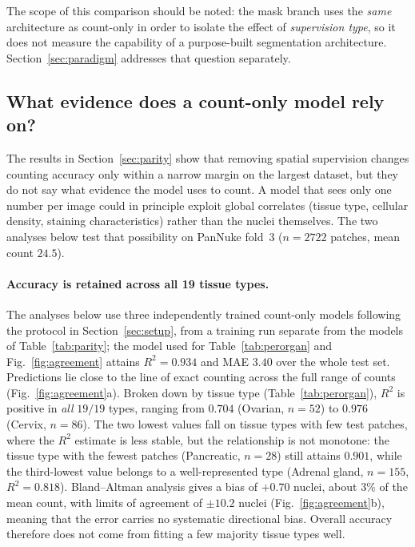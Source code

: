 \documentclass[pdflatex,sn-mathphys-num]{sn-jnl}
\begin{document}
The scope of this comparison should be noted: the mask branch uses the \emph{same} architecture as count-only
in order to isolate the effect of \emph{supervision type}, so it does not measure the capability of a
purpose-built segmentation architecture. Section~\ref{sec:paradigm} addresses that question separately.

\subsection{What evidence does a count-only model rely on?}\label{sec:fidelity}

The results in Section~\ref{sec:parity} show that removing spatial supervision changes counting accuracy only
within a narrow margin on the largest dataset, but they do not say what evidence the model uses to count. A
model that sees only one number per image could in principle exploit global correlates (tissue type, cellular
density, staining characteristics) rather than the nuclei themselves. The two analyses below test that
possibility on PanNuke fold~3 ($n=2722$ patches, mean count $24.5$).

\paragraph{Accuracy is retained across all 19 tissue types.} The analyses below use three independently trained
count-only models following the protocol in Section~\ref{sec:setup}, from a training run separate from the
models of Table~\ref{tab:parity}; the model used for Table~\ref{tab:perorgan} and Fig.~\ref{fig:agreement}
attains $R^2 = 0.934$ and MAE $3.40$ over the whole test set. Predictions lie close to the line of exact
counting across the full range of counts (Fig.~\ref{fig:agreement}a). Broken down by tissue type
(Table~\ref{tab:perorgan}), $R^2$ is positive in \emph{all} $19/19$ types, ranging from $0.704$ (Ovarian,
$n=52$) to $0.976$ (Cervix, $n=86$). The two lowest values fall on tissue types with few test patches, where
the $R^2$ estimate is less stable, but the relationship is not monotone: the tissue type with the fewest
patches (Pancreatic, $n=28$) still attains $0.901$, while the third-lowest value belongs to a well-represented
type (Adrenal gland, $n=155$, $R^2 = 0.818$). Bland--Altman analysis gives a bias of $+0.70$ nuclei, about
$3\%$ of the mean count, with limits of agreement of $\pm10.2$ nuclei (Fig.~\ref{fig:agreement}b), meaning that
the error carries no systematic directional bias. Overall accuracy therefore does not come from fitting a few
majority tissue types well.
\end{document}
